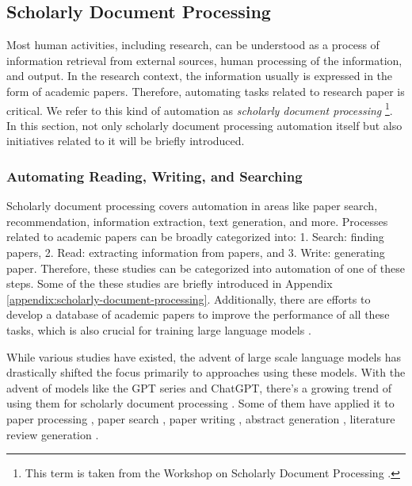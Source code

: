 \subsection{Scholarly Document Processing}
Most human activities, including research, can be understood as a process of information retrieval from external sources, human processing of the information, and output. In the research context, the information usually is expressed in the form of academic papers. Therefore, automating 
tasks related to research paper is critical. We refer to this kind of automation as \textit{scholarly document processing} \footnote{
This term is taken from the Workshop on Scholarly Document Processing \cite{wssdp}.
}. In this section, not only scholarly document processing automation itself but also initiatives related to it will be briefly introduced.

\subsubsection{Automating Reading, Writing, and Searching}
Scholarly document processing covers automation in areas like paper search, recommendation, information extraction, text generation, and more. Processes related to academic papers can be broadly categorized into: 1. Search: finding papers, 2. Read: extracting information from papers, and 3. Write: generating paper. Therefore, these studies can be categorized into automation of one of these steps.  Some of the these studies are briefly introduced in Appendix \ref{appendix:scholarly-document-processing}. Additionally, there are efforts to develop a database of academic papers to improve the performance of all these tasks, which is also crucial for training large language models \cite{kinney2023semantic}. 

While various studies have existed, the advent of large scale language models has drastically shifted the focus primarily to approaches using these models. With the advent of models like the GPT series \cite{openai2023gpt} and ChatGPT, there's a growing trend of using them for scholarly document processing \cite{alzaabi2023chatgpt}. Some of them have applied it to paper processing \cite{elicit,scispace,van2023chatgpt}, paper search \cite{elicit,scispace}, paper writing \cite{transformer2022can}, abstract generation \cite{gao2023comparing}, literature review generation \cite{aydin2022openai}.


